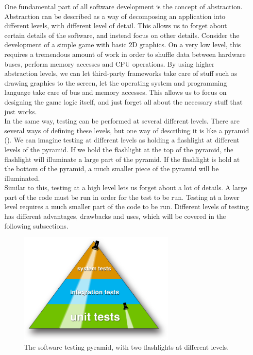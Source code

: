 
One fundamental part of all software development is the concept of
abstraction. Abstraction can be described as a way of decomposing  an
application into different levels, with different level of detail. This
allows us to forget about certain details of the software, and  instead
focus on other details. Consider the development of a simple game with
basic 2D graphics. On a very low level, this requires a tremendous
amount of work in order to shuffle data between hardware buses, perform
memory accesses and CPU operations. By using higher abstraction levels,
we can let third-party frameworks take care of stuff such as drawing
graphics to the screen, let the operating system and programming
language take care of bus and memory accesses. This allows us to focus
on designing the game logic itself, and just forget all about the
necessary stuff that just works.\cite{paper:abstraction}\\

In the same way, testing can be performed at several different levels.
There are several ways of defining these levels, but one way of
describing it is like a pyramid (). We
can imagine testing at different levels as holding a flashlight at
different levels of the pyramid. If we hold the flashlight at the top of
the pyramid, the flashlight will illuminate a large part of the pyramid.
If the flashlight is hold at the bottom of the pyramid, a much smaller
piece of the pyramid will be illuminated.\\

Similar to this, testing at a high level lets us forget about a lot of
details. A large part of the code must be run in order for the test to
be run. Testing at a lower level requires a much smaller part of the
code to be run. Different levels of testing has different advantages,
drawbacks and uses, which will be covered in the following
subsections.\\

\begin{figure}
\centering
\includegraphics[width=0.7\textwidth]{theory/levels/triangle}
\caption{The software testing pyramid, with two flashlights at different levels.}
\label{fig:testing_pyramid}
\end{figure}
